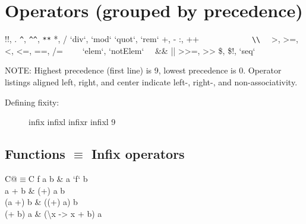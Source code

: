 \documentclass{refcard}
\newcommand{\la}{\textbackslash}
\begin{document}
\section{Operators (grouped by precedence)}

\begin{Ldesc}
	 !!, \hfill .
	 \hfill \verb+^+, \verb+^^+, \verb+**+
	 *, /
	 `div`, `mod`
	 `quot`, `rem`
	 +, -
	 \hfill :, ++
	                 ~~~~~~~~~~~~\verb+\\+
	\Li[comparisons:]     ~~>, >=, <, <=, ==, /=~
	  ~~~`elem`, `notElem`~~
	 \hfill \&\&
	\Li[boolean or] \hfill ||
	 >{>}=, >{>}
	 \$, \$!, `seq`
\end{Ldesc}

\noindent
NOTE: Highest precedence (first line) is 9, lowest precedence is 0.  Operator
listings aligned left, right, and center indicate left-, right-, and
non-associativity.

\begin{description}
\item [Defining fixity:]
\begin{ldesc}
	 infix  
	 infixl  \I{+-+}
	 infixr  \I{-!-}
	 infixl 9
\end{ldesc}
\end{description}

\subsection{Functions $\equiv$ Infix operators}

\begin{tabular}{C@{\s$\equiv$\s}C}
	f a b & a `f` b \\
	a + b & (+) a b \\
	(a +) b & ((+) a) b \\
	(+ b) a & (\la{}x -> x + b) a \\
\end{tabular}
\end{document}
